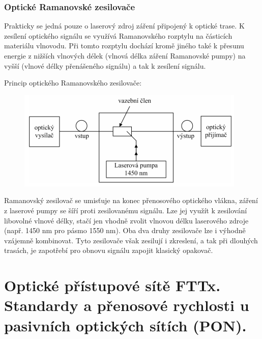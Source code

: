 \subsubsection{Optické Ramanovské zesilovače}
Prakticky se jedná pouze o laserový zdroj záření připojený k optické trase. K zesílení optického signálu se využívá Ramanovského rozptylu na částicích materiálu vlnovodu. Při tomto rozptylu dochází kromě jiného také k přesunu energie z nižších vlnových délek (vlnová délka záření Ramanovské pumpy) na vyšší (vlnové délky přenášeného signálu) a tak k zesílení signálu.

Princip optického Ramanovského zesilovače:
\begin{figure}[!ht]
\begin{center}
    \includegraphics[scale=1]{obrazky/Raman.png}
  \end{center}
\end{figure}


Ramanovský zesilovač se umisťuje na konec přenosového optického vlákna, záření z laserové pumpy se šíří proti zesilovanému signálu. Lze jej využít k zesilování libovolné vlnové délky, stačí jen vhodně zvolit vlnovou délku laserového zdroje (např. 1450 nm pro pásmo 1550 nm). Oba dva druhy zesilovače lze i výhodně vzájemně kombinovat. Tyto zesilovače však zesilují i zkreslení, a tak při dlouhých trasách, je zapotřebí pro obnovu signálu zapojit klasický opakovač. 


\clearpage
\section{Optické přístupové sítě FTTx. Standardy a přenosové rychlosti u pasivních optických sítích (PON).}

